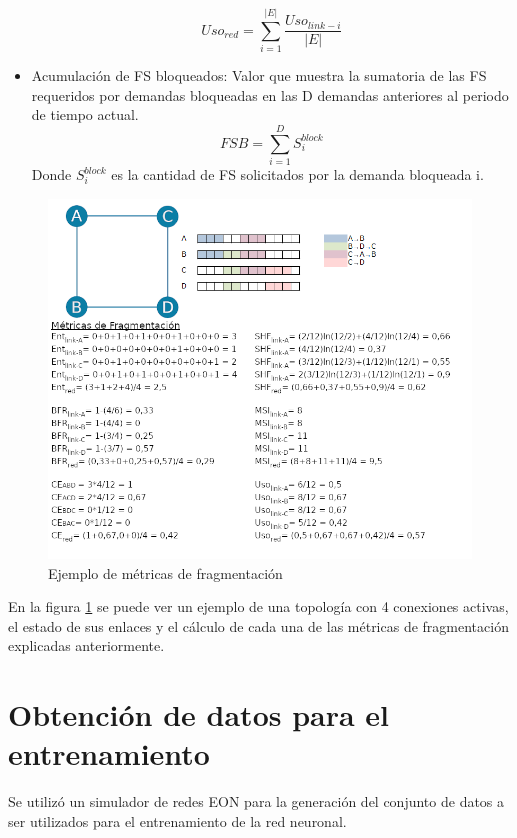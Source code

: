 \begin{itemize}
    \begin{equation}
        Uso_{red} = \sum_{i=1}^{\left | E \right |} \frac{Uso_{link -i}}{\left | E \right |}
    \end{equation}
    
    \item Acumulación de FS bloqueados: Valor que muestra la sumatoria de las FS requeridos por demandas bloqueadas en las D demandas anteriores al periodo de tiempo actual.
    \begin{equation}
        FSB = \sum_{i=1}^{D} S_{i}^{block}
    \end{equation}
    Donde \(S_{i}^{block}\) es la cantidad de FS solicitados por la demanda bloqueada i.
\end{itemize}

\begin{figure}[!h]
    \centering
    \includegraphics[width=1\textwidth]{capitulos/img/ejemploMetricasCompleto4.png}
    \caption{Ejemplo de métricas de fragmentación}
    \label{fig:ejemploMetricas}
\end{figure}

En la figura \ref{fig:ejemploMetricas} se puede ver un ejemplo de una topología con 4 conexiones activas, el estado de sus enlaces y el cálculo de cada una de las métricas de fragmentación explicadas anteriormente. 

\section{Obtención de datos para el entrenamiento}
Se utilizó un simulador de redes EON \cite{davalos2019spectrum} para la generación del conjunto de datos a ser utilizados para el entrenamiento de la red neuronal.

